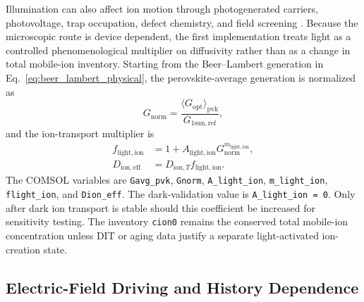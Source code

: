 Illumination can also affect ion motion through photogenerated carriers,
photovoltage, trap occupation, defect chemistry, and field screening
\cite{Calado_2016,Calado_2022_Driftfusion}. Because the microscopic route is
device dependent, the first implementation treats light as a controlled
phenomenological multiplier on diffusivity rather than as a change in total
mobile-ion inventory. Starting from the Beer--Lambert generation in
Eq.~\ref{eq:beer_lambert_physical}, the perovskite-average generation is
normalized as
\begin{equation}
G_{\mathrm{norm}}=
\frac{\langle G_{\mathrm{opt}}\rangle_{\mathrm{pvk}}}
{G_{\mathrm{1sun,ref}}},
\end{equation}
and the ion-transport multiplier is
\begin{align}
f_{\mathrm{light,ion}} &=
1+A_{\mathrm{light,ion}}G_{\mathrm{norm}}^{m_{\mathrm{light,ion}}},\\
D_{\mathrm{ion,eff}} &= D_{\mathrm{ion},T}f_{\mathrm{light,ion}}.
\label{eq:dion_eff}
\end{align}
The COMSOL variables are \texttt{Gavg\_pvk}, \texttt{Gnorm},
\texttt{A\_light\_ion}, \texttt{m\_light\_ion}, \texttt{flight\_ion}, and
\texttt{Dion\_eff}. The dark-validation value is
\texttt{A\_light\_ion = 0}. Only after dark ion transport is stable should this
coefficient be increased for sensitivity testing. The inventory
\texttt{cion0} remains the conserved total mobile-ion concentration unless DIT
or aging data justify a separate light-activated ion-creation state.

\subsection{Electric-Field Driving and History Dependence}

